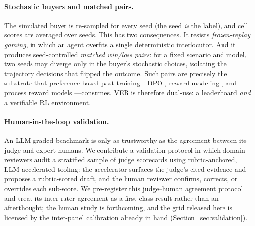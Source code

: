 \paragraph{Stochastic buyers and matched pairs.}
The simulated buyer is re-sampled for every seed (the seed \emph{is} the label),
and cell scores are averaged over seeds. This has two consequences. It resists
\emph{frozen-replay gaming}, in which an agent overfits a single deterministic
interlocutor. And it produces seed-controlled \emph{matched win/loss pairs}: for
a fixed scenario and model, two seeds may diverge only in the buyer's stochastic
choices, isolating the trajectory decisions that flipped the outcome. Such pairs
are precisely the substrate that preference-based post-training---DPO
\citep{rafailov2023dpo}, reward modeling \citep{ouyang2022instructgpt}, and
process reward models \citep{lightman2023letsverify}---consumes. VEB is therefore
dual-use: a leaderboard \emph{and} a verifiable RL environment.

\paragraph{Human-in-the-loop validation.}
An LLM-graded benchmark is only as trustworthy as the agreement between its judge
and expert humans. We contribute a validation protocol in which domain reviewers
audit a stratified sample of judge scorecards using rubric-anchored,
LLM-accelerated tooling: the accelerator surfaces the judge's cited evidence and
proposes a rubric-scored draft, and the human reviewer confirms, corrects, or
overrides each sub-score. We pre-register this judge--human agreement protocol and
treat its inter-rater agreement as a first-class result rather than an afterthought;
the human study is forthcoming, and the grid released here is licensed by the
inter-panel calibration already in hand (Section~\ref{sec:validation}).

